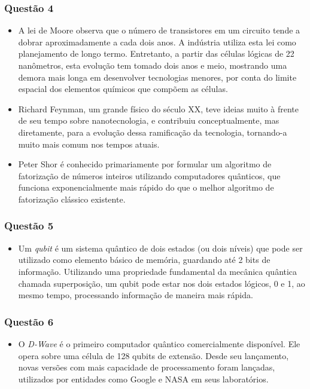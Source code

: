 \documentclass{article}
\begin{document}
\subsubsection*{Questão 4}
\begin{itemize}
\item A lei de Moore observa que o número de transistores em um circuito tende a dobrar aproximadamente a cada dois anos. A indústria utiliza esta lei como planejamento de longo termo. Entretanto, a partir das células lógicas de 22 nanômetros, esta evolução tem tomado dois anos e meio, mostrando uma demora mais longa em desenvolver tecnologias menores, por conta do limite espacial dos elementos químicos que compõem as células.
\item Richard Feynman, um grande físico do século XX, teve ideias muito à frente de seu tempo sobre nanotecnologia, e contribuiu conceptualmente, mas diretamente, para a evolução dessa ramificação da tecnologia, tornando-a muito mais comum nos tempos atuais.
\item Peter Shor é conhecido primariamente por formular um algoritmo de fatorização de números inteiros utilizando computadores quânticos, que funciona exponencialmente mais rápido do que o melhor algoritmo de fatorização clássico existente. 
\end{itemize}

\subsubsection*{Questão 5}
\begin{itemize}
\item Um \textit{qubit} é um sistema quântico de dois estados (ou dois níveis) que pode ser utilizado como elemento básico de memória, guardando até 2 bits de informação. Utilizando uma propriedade fundamental da mecânica quântica chamada superposição, um qubit pode estar nos dois estados lógicos, 0 e 1, ao mesmo tempo, processando informação de maneira mais rápida.
\end{itemize}

\subsubsection*{Questão 6}
\begin{itemize}
\item O \textit{D-Wave} é o primeiro computador quântico comercialmente disponível. Ele opera sobre uma célula de 128 qubits de extensão. Desde seu lançamento, novas versões com mais capacidade de processamento foram lançadas, utilizados por entidades como Google e NASA em seus laboratórios.
\end{itemize}
\end{document}
